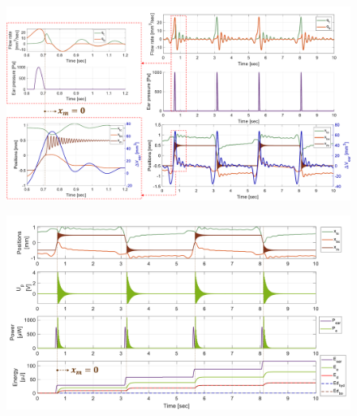 \documentclass[3p,twocolumn,preprint]{elsarticle}
\begin{document}
\begin{figure}[!htbp]
	\centering
	\captionsetup{justification=centering}
	\includegraphics[trim={0cm 0cm 0cm 0.5cm},clip, width=\textwidth]{figures/positions+DeltaV_debits_pear.pdf}
	\caption{}
	\label{fig:positions+DeltaV_debits_pear}
\end{figure}
\begin{figure}[!htbp]
	\centering
	\captionsetup{justification=centering}
	\includegraphics[trim={0cm 0cm 0cm 0.9cm},clip, width=\textwidth]{figures/positions_Up_puissances_energies.pdf}
	\caption{}
	\label{fig:positions_Up_puissances_energies}
\end{figure}
\end{document}
